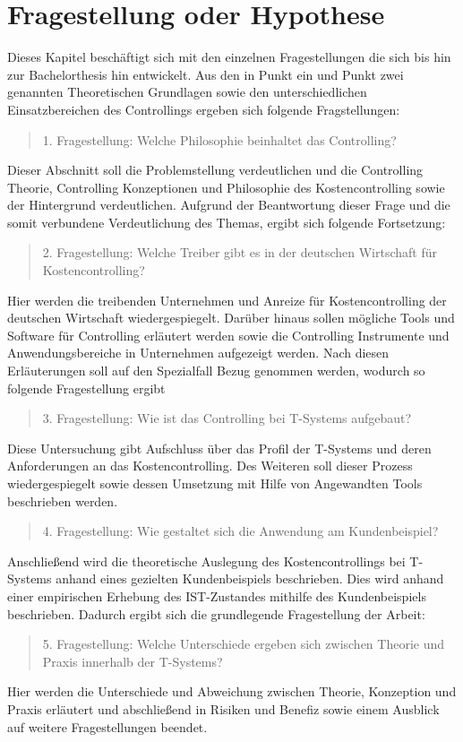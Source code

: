 
\chapter{Fragestellung oder Hypothese}
\label{ch:Fragestellung}

Dieses Kapitel beschäftigt sich mit den einzelnen Fragestellungen die sich bis hin zur Bachelorthesis hin entwickelt. 
Aus den in Punkt ein und Punkt zwei genannten Theoretischen Grundlagen sowie den unterschiedlichen Einsatzbereichen des Controllings ergeben sich folgende Fragstellungen:
\begin{quote}
1. Fragestellung: 
Welche Philosophie beinhaltet das Controlling?
\end{quote}

Dieser Abschnitt soll die Problemstellung verdeutlichen und die Controlling Theorie, Controlling Konzeptionen und Philosophie des Kostencontrolling sowie der Hintergrund verdeutlichen.
Aufgrund der Beantwortung dieser Frage und die somit verbundene Verdeutlichung des Themas, ergibt sich folgende Fortsetzung:
\begin{quote}
2. Fragestellung: 
Welche Treiber gibt es in der deutschen Wirtschaft für Kostencontrolling?
\end{quote}

Hier werden die treibenden Unternehmen und Anreize für Kostencontrolling der deutschen Wirtschaft wiedergespiegelt. Darüber hinaus sollen mögliche Tools und Software für Controlling erläutert werden sowie die Controlling Instrumente und Anwendungsbereiche in Unternehmen aufgezeigt werden.
Nach diesen Erläuterungen soll auf den Spezialfall Bezug genommen werden, wodurch so folgende Fragestellung ergibt
\begin{quote}
3. Fragestellung: 
Wie ist das Controlling bei T-Systems aufgebaut?
\end{quote}

Diese Untersuchung gibt Aufschluss über das Profil der T-Systems und deren Anforderungen an das Kostencontrolling. Des Weiteren soll dieser Prozess wiedergespiegelt sowie dessen Umsetzung mit Hilfe von Angewandten Tools beschrieben werden.
\begin{quote}
4. Fragestellung: 
Wie gestaltet sich die Anwendung am Kundenbeispiel?
\end{quote}

Anschließend wird die theoretische Auslegung des Kostencontrollings bei T-Systems anhand eines gezielten Kundenbeispiels beschrieben. Dies wird anhand einer empirischen Erhebung des IST-Zustandes mithilfe des Kundenbeispiels beschrieben. Dadurch ergibt sich die grundlegende Fragestellung der Arbeit:
\begin{quote}
5. Fragestellung: 
Welche Unterschiede ergeben sich zwischen Theorie und Praxis innerhalb der T-Systems?
\end{quote}

Hier werden die Unterschiede und Abweichung zwischen Theorie, Konzeption und Praxis erläutert und abschließend in Risiken und Benefiz sowie einem Ausblick auf weitere Fragestellungen beendet.


